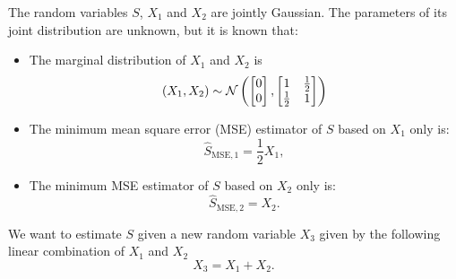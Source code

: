 \else

\question[20] %

The random variables $S$, $X_1$ and $X_2$ are jointly Gaussian. The parameters of its joint distribution are unknown, but it is known that:
\begin{itemize}
\item The marginal distribution of $X_1$ and $X_2$ is
$$(X_1,X_2) \sim {\cal N}\left( \begin{bmatrix} 0 \\ 0 \end{bmatrix}, \begin{bmatrix} 1 & \frac{1}{2} \\ \frac{1}{2} & 1 \end{bmatrix} \right)$$
\item The minimum mean square error (MSE) estimator of $S$ based on $X_1$ only is:
$$\widehat S_{\text{MSE},1}=\frac{1}{2} X_1,$$
\item The minimum MSE estimator of $S$ based on $X_2$ only is:
$$\widehat S_{\text{MSE},2}= X_2.$$
\end{itemize}

We want to estimate $S$ given a new random variable $X_3$ given by the following linear combination of $X_1$ and $X_2$
$$X_3= X_1 +  X_2.$$


\begin{solution}
\end{solution}


\fi